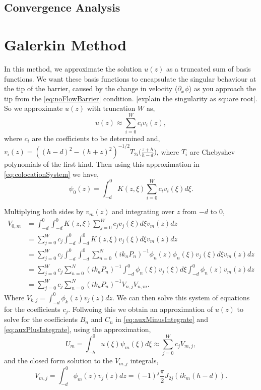 \documentclass[a4paper,12pt]{report}
\begin{document}
\subsection{Convergence Analysis}


\section{Galerkin Method}
In this method, we approximate the solution $u(z)$ as a truncated sum of basis functions. We want these basis functions to encapsulate the singular behaviour at the tip of the barrier, caused by the change in velocity ($\partial_x \phi$) as you approach the tip from the \ref{eq:noFlowBarrier} condition. [explain the singularity as square root]. So we approximate $u(z)$ with truncation $W$ as,
\begin{equation}
\label{eq:galerkinApprox}
u(z) \approx \sum_{i=0}^{W} c_i v_i(z),
\end{equation}
where $c_i$ are the coefficients to be determined and,\\ $\displaystyle v_i(z) = ((h-d)^2-(h+z)^2)^{-1/2}T_{2i}\Big(\frac{z+h}{h-d}\Big)$, where $T_i$ are Chebyshev polynomials of the first kind. Then using this approximation in \ref{eq:colocationSystem} we have,
\begin{equation}
\label{eq:galerkinSystem}
\psi_0(z) = \int_{-d}^0 K(z,\xi) \sum_{i=0}^{W} c_i v_i(\xi) d\xi.
\end{equation}

Multiplying both sides by $v_m(z)$ and integrating over $z$ from $-d$ to $0$,
\begin{align}
\label{eq:galerkinIntegrate}
V_{0,m} &= \int_{-d}^0 \int_{-d}^0 K(z,\xi) \sum_{j=0}^{W} c_j v_j(\xi)  d\xi v_m(z) dz\nonumber\\
&= \sum_{j=0}^{W} c_j \int_{-d}^0 \int_{-d}^0 K(z,\xi) v_j(\xi)  d\xi v_m(z) dz\nonumber\\
&= \sum_{j=0}^{W} c_j \int_{-d}^0 \int_{-d}^0 \sum^N_{n=0} (ik_n P_n)^{-1} \phi_n(z)\phi_n(\xi) v_j(\xi) d\xi v_m(z) dz\nonumber\\
&= \sum_{j=0}^{W} c_j \sum^N_{n=0} (ik_n P_n)^{-1} \int_{-d}^0  \phi_n(\xi) v_j(\xi) d\xi \int_{-d}^0\phi_n(z) v_m(z) dz \nonumber\\
&= \sum_{j=0}^{W} c_j \sum^N_{n=0} (ik_n P_n)^{-1}  V_{n,j} V_{n,m}.
\end{align}
Where $V_{k,j} = \int_{-d}^0 \phi_k(z) v_j(z) dz$. We can then solve this system of equations for the coefficients $c_j$. Follwoing this we obtain an approximation of $u(z)$ to solve for the coefficients $B_n$ and $C_n$ in \ref{eq:auxMinusIntegrate} and \ref{eq:auxPlusIntegrate}, using the approximation,
\begin{equation}
\label{eq:galerkinApproxU}
U_m = \int_{-h}^{0} u(\xi) \psi_m(\xi) d\xi \approx \sum_{j=0}^{W} c_j V_{m,j},
\end{equation}
and the closed form solution \cite{bateman1954} to the $V_{m,j}$ integrals,
\begin{equation}
\label{eq:VIntegral}
V_{m,j} = \int_{-d}^{0} \phi_m(z) v_j(z) dz = (-1)^j \frac{\pi}{2} J_{2j}(ik_m(h-d)).
\end{equation}
\end{document}
